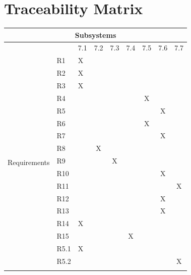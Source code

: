 \documentclass[hidelinks, 12pt, a4paper]{article}
\begin{document}
\section{Traceability Matrix}


\begin{table}[H]
      \centering
      \begin{tabular}{|l|l|l|c|c|c|c|c|c|}
            \hline

            \multicolumn{9}{|c|}{Subsystems}                  \\ \hline
             &      & 7.1 & 7.2 & 7.3 & 7.4 & 7.5 & 7.6 & 7.7 \\ \hline
            \multirow{22}{*}{Requirements}
             & R1   & X   &     &     &     &     &     &     \\ \cline{2-9}
             & R2   & X   &     &     &     &     &     &     \\ \cline{2-9}
             & R3   & X   &     &     &     &     &     &     \\ \cline{2-9}
             & R4   &     &     &     &     & X   &     &     \\ \cline{2-9}
             & R5   &     &     &     &     &     & X   &     \\ \cline{2-9}
             & R6   &     &     &     &     & X   &     &     \\ \cline{2-9}
             & R7   &     &     &     &     &     & X   &     \\ \cline{2-9}
             & R8   &     & X   &     &     &     &     &     \\ \cline{2-9}
             & R9   &     &     & X   &     &     &     &     \\ \cline{2-9}
             & R10  &     &     &     &     &     & X   &     \\ \cline{2-9}
             & R11  &     &     &     &     &     &     & X   \\ \cline{2-9}
             & R12  &     &     &     &     &     & X   &     \\ \cline{2-9}
             & R13  &     &     &     &     &     & X   &     \\ \cline{2-9}
             & R14  & X   &     &     &     &     &     &     \\ \cline{2-9}
             & R15  &     &     &     & X   &     &     &     \\ \cline{2-9}
             & R5.1 & X   &     &     &     &     &     &     \\ \cline{2-9}
             & R5.2 &     &     &     &     &     &     & X   \\ \cline{2-9}

\end{tabular}
\end{table}
\end{document}
